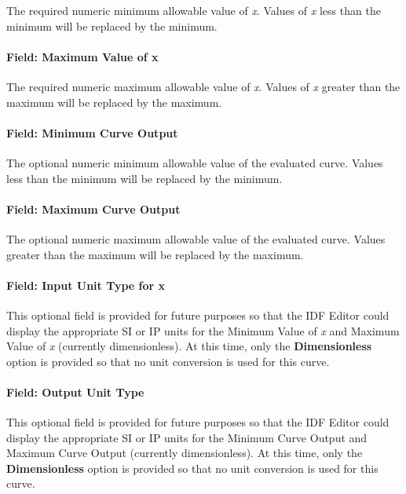 The required numeric minimum allowable value of \emph{x}. Values of \emph{x} less than the minimum will be replaced by the minimum.

\paragraph{Field: Maximum Value of x}\label{field-maximum-value-of-x-14}

The required numeric maximum allowable value of \emph{x}. Values of \emph{x} greater than the maximum will be replaced by the maximum.

\paragraph{Field: Minimum Curve Output}\label{field-minimum-curve-output-13}

The optional numeric minimum allowable value of the evaluated curve. Values less than the minimum will be replaced by the minimum.

\paragraph{Field: Maximum Curve Output}\label{field-maximum-curve-output-12}

The optional numeric maximum allowable value of the evaluated curve. Values greater than the maximum will be replaced by the maximum.

\paragraph{Field: Input Unit Type for x}\label{field-input-unit-type-for-x-13}

This optional field is provided for future purposes so that the IDF Editor could display the appropriate SI or IP units for the Minimum Value of \emph{x} and Maximum Value of \emph{x} (currently dimensionless). At this time, only the \textbf{Dimensionless} option is provided so that no unit conversion is used for this curve.

\paragraph{Field: Output Unit Type}\label{field-output-unit-type-12}

This optional field is provided for future purposes so that the IDF Editor could display the appropriate SI or IP units for the Minimum Curve Output and Maximum Curve Output (currently dimensionless). At this time, only the \textbf{Dimensionless} option is provided so that no unit conversion is used for this curve.

